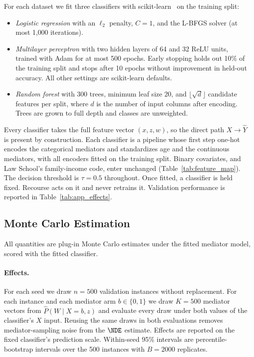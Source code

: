For each dataset we fit three classifiers with
scikit-learn~\citep{pedregosa2011scikit} on the training split:
\begin{itemize}[nosep]
  \item \emph{Logistic regression} with an $\ell_2$ penalty, $C=1$, and the
        L-BFGS solver (at most 1{,}000 iterations).
  \item \emph{Multilayer perceptron} with two hidden layers of 64 and 32 ReLU
        units, trained with Adam for at most 500 epochs. Early stopping holds
        out 10\% of the training split and stops after 10 epochs without
        improvement in held-out accuracy. All other settings are scikit-learn
        defaults.
  \item \emph{Random forest} with 300 trees, minimum leaf size 20, and
        $\lfloor\sqrt d\rfloor$ candidate features per split, where $d$ is the
        number of input columns after encoding. Trees are grown to full depth
        and classes are unweighted.
\end{itemize}
Every classifier takes the full feature vector $(x,z,w)$, so the direct path
$X\to\hat Y$ is present by construction. Each classifier is a pipeline whose
first step one-hot encodes the categorical mediators and standardizes age and
the continuous mediators, with all encoders fitted on the training split.
Binary covariates, and Law School's family-income code, enter unchanged
(Table~\ref{tab:feature_map}). The decision threshold is $\tau=0.5$
throughout. Once fitted, a classifier is held fixed. Recourse acts on it and
never retrains it. Validation performance is reported in
Table~\ref{tab:app_effects}.

\subsection{Monte Carlo Estimation}
\label{app:exp_mc}

All quantities are plug-in Monte Carlo estimates under the fitted mediator
model, scored with the fitted classifier.

\paragraph{Effects.}
For each seed we draw $n=500$ validation instances without replacement. For
each instance and each mediator arm $b\in\{0,1\}$ we draw $K=500$ mediator
vectors from $\hat P(W\mid X=b,z)$ and evaluate every draw under both values of
the classifier's $X$ input. Reusing the same draws in both evaluations removes
mediator-sampling noise from the $\NDE$ estimate. Effects are reported on the
fixed classifier's prediction scale. Within-seed 95\% intervals are
percentile-bootstrap intervals over the 500 instances with $B=2000$
replicates.

